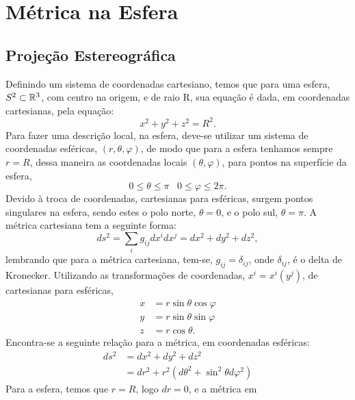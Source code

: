 \setcounter{page}{1}

\section{Métrica na Esfera}

\subsection{Projeção Estereográfica}


Definindo um sistema de coordenadas cartesiano, temos que para uma 
esfera, $S^2\subset\mathbb{R}^3$, com centro na origem, e de raio R, sua 
equação é dada, em coordenadas cartesianas, pela equação: 
%
\begin{equation}
x^2 + y^2 + z^2 = R^2.
\end{equation}
%
Para fazer uma descrição local, na esfera, deve-se utilizar um 
sistema de coordenadas esféricas, $(r,\theta,\varphi)$, de modo que 
para a esfera tenhamos sempre $r = R$, dessa maneira as coordenadas 
locais $(\theta,\varphi)$, para pontos na superfície da esfera,  
%
\begin{equation}
0 \leq \theta \leq \pi \ \, \ \ 0 \leq \varphi \leq 2\pi.
\end{equation}
%
Devido à troca de coordenadas, cartesianas para esféricas, surgem 
pontos singulares na esfera, sendo estes o polo norte, $\theta = 0$, e 
o polo sul, $\theta = \pi$. A métrica cartesiana tem a seguinte forma:
%
\begin{equation}
ds^2 = \sum_{i}g_{ij}dx^i dx^j = dx^2 + dy^2 + dz^2, 
\end{equation}
%
lembrando que para a métrica cartesiana, tem-se, $g_{ij} = \delta_{ij}$, 
onde $\delta_{ij}$, é o delta de Kronecker. Utilizando as transformações 
de  coordenadas, $x^i = x^i(y^j)$, de cartesianas para esféricas,
%
\begin{align}
x &= r\sin\theta\cos\varphi \\ 
y &= r\sin\theta\sin\varphi \\
z &= r\cos\theta. 
\end{align}
%
Encontra-se a seguinte relação para a métrica, em coordenadas esféricas:
%
\begin{align}
\nonumber ds^2 &= dx^2 + dy^2 + dz^2 \\
               &= dr^2 + r^2(d\theta^2 + \sin^2\theta d\varphi^2)
\end{align}
%
Para a esfera, temos que $r = R$, logo $dr = 0$, e a métrica em 
